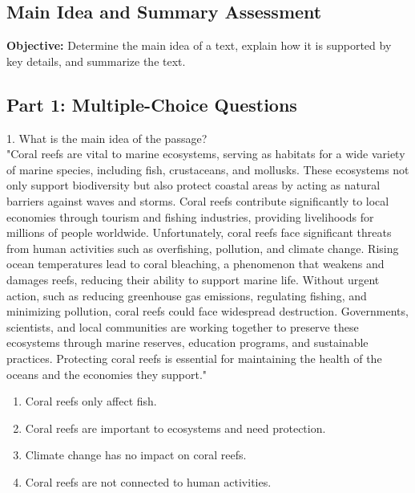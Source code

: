 \documentclass[12pt]{article}
\begin{document}
\subsection*{Main Idea and Summary Assessment}
\onehalfspacing

\begin{tcolorbox}[colframe=black!40, colback=gray!0, title=Learning Objective]
\textbf{Objective:} Determine the main idea of a text, explain how it is supported by key details, and summarize the text.
\end{tcolorbox}

\subsection*{Part 1: Multiple-Choice Questions}

1. What is the main idea of the passage?\\
"Coral reefs are vital to marine ecosystems, serving as habitats for a wide variety of marine species, including fish, crustaceans, and mollusks. These ecosystems not only support biodiversity but also protect coastal areas by acting as natural barriers against waves and storms. Coral reefs contribute significantly to local economies through tourism and fishing industries, providing livelihoods for millions of people worldwide. Unfortunately, coral reefs face significant threats from human activities such as overfishing, pollution, and climate change. Rising ocean temperatures lead to coral bleaching, a phenomenon that weakens and damages reefs, reducing their ability to support marine life. Without urgent action, such as reducing greenhouse gas emissions, regulating fishing, and minimizing pollution, coral reefs could face widespread destruction. Governments, scientists, and local communities are working together to preserve these ecosystems through marine reserves, education programs, and sustainable practices. Protecting coral reefs is essential for maintaining the health of the oceans and the economies they support."\\
\begin{enumerate}[label=\Alph*.]
    \item Coral reefs only affect fish.  
    \item Coral reefs are important to ecosystems and need protection.  
    \item Climate change has no impact on coral reefs.  
    \item Coral reefs are not connected to human activities.  
\end{enumerate}
\end{document}
